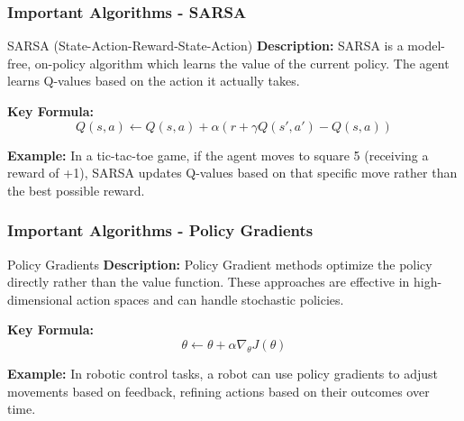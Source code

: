 \documentclass{beamer}
\begin{document}
\begin{frame}[fragile]
    \frametitle{Important Algorithms - SARSA}
    \begin{block}{SARSA (State-Action-Reward-State-Action)}
        \textbf{Description:}  
        SARSA is a model-free, on-policy algorithm which learns the value of the current policy. The agent learns Q-values based on the action it actually takes.

        \textbf{Key Formula:}
        \begin{equation}
        Q(s, a) \leftarrow Q(s, a) + \alpha \left( r + \gamma Q(s', a') - Q(s, a) \right)
        \end{equation}
        
        \textbf{Example:}  
        In a tic-tac-toe game, if the agent moves to square 5 (receiving a reward of +1), SARSA updates Q-values based on that specific move rather than the best possible reward.
    \end{block}
\end{frame}

\begin{frame}[fragile]
    \frametitle{Important Algorithms - Policy Gradients}
    \begin{block}{Policy Gradients}
        \textbf{Description:}  
        Policy Gradient methods optimize the policy directly rather than the value function. These approaches are effective in high-dimensional action spaces and can handle stochastic policies.

        \textbf{Key Formula:}
        \begin{equation}
        \theta \leftarrow \theta + \alpha \nabla_\theta J(\theta)
        \end{equation}
        
        \textbf{Example:}  
        In robotic control tasks, a robot can use policy gradients to adjust movements based on feedback, refining actions based on their outcomes over time.
    \end{block}
\end{frame}
\end{document}
